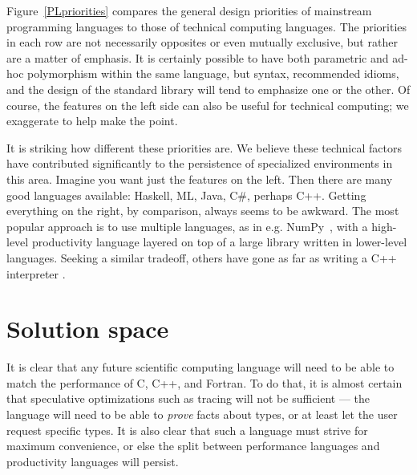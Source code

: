Figure~\ref{PLpriorities} compares the general design priorities of mainstream programming
languages to those of technical computing languages. The priorities in each row are not
necessarily opposites or even mutually exclusive, but rather are a matter of emphasis.
It is certainly possible to have both parametric and ad-hoc polymorphism within
the same language, but syntax, recommended idioms, and the design of the standard library will
tend to emphasize one or the other. Of course, the features on the left side can
also be useful for technical computing; we exaggerate to help make the point.

It is striking how different these priorities are. We believe these technical factors have
contributed significantly to the persistence of specialized environments in this area.
Imagine you want just the features on the left. Then there are many good
languages available: Haskell, ML, Java, C\#, perhaps C++.
Getting everything on the right, by comparison, always seems to be awkward.
The most popular approach is to use multiple languages, as in e.g. NumPy~\cite{numpy},
with a high-level productivity language layered on top of a large library
written in lower-level languages. Seeking a similar tradeoff,
others have gone as far as writing a C++ interpreter \cite{vasilev2012cling}.






\section{Solution space}

It is clear that any future scientific computing language will need to be able to
match the performance of C, C++, and Fortran. To do that, it is almost certain
that speculative optimizations such as tracing \cite{tracingjit} will not be sufficient ---
the language will need to be able to \emph{prove} facts about types, or at least
let the user request specific types. It is also clear that such a language must
strive for maximum convenience, or else the split between performance languages
and productivity languages will persist.

